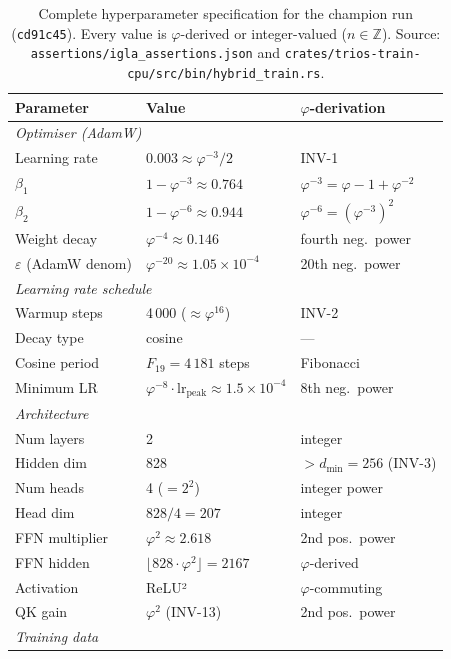 \begin{table}[h]
\centering
\caption{Complete hyperparameter specification for the champion run
  (\texttt{cd91c45}).  Every value is $\varphi$-derived or
  integer-valued ($n\in\mathbb{Z}$).  Source:
  \texttt{assertions/igla\_assertions.json} and
  \texttt{crates/trios-train-cpu/src/bin/hybrid\_train.rs}.}
\label{tab:full-hyperparams}
\begin{tabular}{lll}
\toprule
Parameter & Value & $\varphi$-derivation\\
\midrule
\multicolumn{3}{l}{\textit{Optimiser (AdamW)}}\\
Learning rate & $0.003 \approx \varphi^{-3}/2$ & INV-1\\
$\beta_1$ & $1 - \varphi^{-3} \approx 0.764$ & $\varphi^{-3} = \varphi-1+\varphi^{-2}$\\
$\beta_2$ & $1 - \varphi^{-6} \approx 0.944$ & $\varphi^{-6} = (\varphi^{-3})^2$\\
Weight decay & $\varphi^{-4} \approx 0.146$ & fourth neg.\ power\\
$\varepsilon$ (AdamW denom) & $\varphi^{-20} \approx 1.05\times10^{-4}$ & 20th neg.\ power\\
\midrule
\multicolumn{3}{l}{\textit{Learning rate schedule}}\\
Warmup steps & 4\,000 ($\approx \varphi^{16}$) & INV-2\\
Decay type & cosine & —\\
Cosine period & $F_{19} = 4\,181$ steps & Fibonacci\\
Minimum LR & $\varphi^{-8} \cdot \mathrm{lr}_{\mathrm{peak}} \approx 1.5\times10^{-4}$ & 8th neg.\ power\\
\midrule
\multicolumn{3}{l}{\textit{Architecture}}\\
Num layers & 2 & integer\\
Hidden dim & 828 & $> d_{\min}=256$ (INV-3)\\
Num heads & 4 ($= 2^2$) & integer power\\
Head dim & $828/4 = 207$ & integer\\
FFN multiplier & $\varphi^2 \approx 2.618$ & 2nd pos.\ power\\
FFN hidden & $\lfloor 828 \cdot \varphi^2 \rfloor = 2167$ & $\varphi$-derived\\
Activation & ReLU² & $\varphi$-commuting\\
QK gain & $\varphi^2$ (INV-13) & 2nd pos.\ power\\
\midrule
\multicolumn{3}{l}{\textit{Training data}}\\

\end{tabular}
\end{table}
